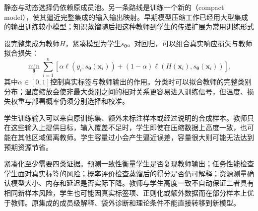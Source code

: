 静态与动态选择仍依赖原成员池。另一条路线是训练一个新的（compact model），使其逼近完整集成的输入输出映射。早期模型压缩工作已经用大型集成的输出训练较小模型；知识蒸馏随后把这种教师到学生的传递扩展为常用训练形式

设完整集成为教师$H$，紧凑模型为学生$s_{\bm{\theta}}$。对回归，可以组合真实响应损失与教师拟合损失：
\begin{equation}
  \min_{\bm{\theta}}
  \sum_{i=1}^{n}
  \left[
    \alpha\ell\!\left(y_i,s_{\bm{\theta}}(\bm{x}_i)\right)
    +(1-\alpha)
    \ell\!\left(H(\bm{x}_i),s_{\bm{\theta}}(\bm{x}_i)\right)
  \right],
  \label{eq:ensemble-compression-objective}
\end{equation}
其中$\alpha\in[0,1]$控制真实标签与教师输出的作用。分类时可以拟合教师的完整类别分布；温度缩放会使非最大类别之间的相对关系更容易进入训练信号，但温度、损失权重与部署概率仍须分别选择和校准。

学生训练输入可以来自原训练集、额外未标注样本或经过说明的合成样本。教师只在这些输入上提供目标，输入覆盖不足时，学生即使在压缩数据上高度一致，也可能在其他区域偏离教师。学生容量过小会产生逼近误差，容量很大则可能无法达到预期资源节省。

紧凑化至少需要四类证据。预测一致性衡量学生是否复现教师输出；任务性能检查学生面对真实标签的风险；概率评价检查蒸馏后的得分是否仍可解释；资源测量确认模型大小、内存和延迟是否实际下降。教师与学生高度一致不自动保证二者具有相同新样本风险，学生也可能因真实标签项、正则化或额外数据而在部分样本上优于教师。原集成的成员级解释、袋外诊断和理论条件不能直接转移到新模型。
